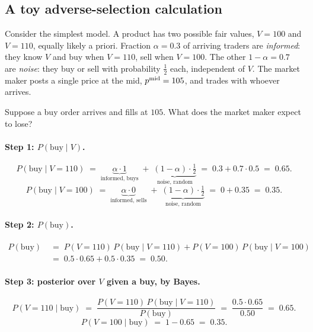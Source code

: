 \subsection{A toy adverse-selection calculation}
\label{subsec:toy_adverse}

Consider the simplest model. A product has two possible fair values,
$V = 100$ and $V = 110$, equally likely a priori. Fraction $\alpha =
0.3$ of arriving traders are \emph{informed}: they know $V$ and buy
when $V = 110$, sell when $V = 100$. The other $1 - \alpha = 0.7$ are
\emph{noise}: they buy or sell with probability $\tfrac{1}{2}$ each,
independent of $V$. The market maker posts a single price at the mid,
$p^{\mathrm{mid}} = 105$, and trades with whoever arrives.

Suppose a buy order arrives and fills at $105$. What does the market
maker expect to lose?

\paragraph{Step 1: $P(\text{buy} \mid V)$.}
\[
  P(\text{buy} \mid V = 110) \;=\; \underbrace{\alpha \cdot 1}_{\text{informed, buys}}
    \;+\; \underbrace{(1 - \alpha) \cdot \tfrac{1}{2}}_{\text{noise, random}}
    \;=\; 0.3 + 0.7 \cdot 0.5 \;=\; 0.65.
\]
\[
  P(\text{buy} \mid V = 100) \;=\; \underbrace{\alpha \cdot 0}_{\text{informed, sells}}
    \;+\; \underbrace{(1 - \alpha) \cdot \tfrac{1}{2}}_{\text{noise, random}}
    \;=\; 0 + 0.35 \;=\; 0.35.
\]

\paragraph{Step 2: $P(\text{buy})$.}
\begin{align*}
  P(\text{buy}) &\;=\; P(V = 110)\,P(\text{buy} \mid V = 110)
                     + P(V = 100)\,P(\text{buy} \mid V = 100) \\
                &\;=\; 0.5 \cdot 0.65 + 0.5 \cdot 0.35
                 \;=\; 0.50.
\end{align*}

\paragraph{Step 3: posterior over $V$ given a buy, by Bayes.}
\[
  P(V = 110 \mid \text{buy})
    \;=\; \frac{P(V = 110)\,P(\text{buy} \mid V = 110)}{P(\text{buy})}
    \;=\; \frac{0.5 \cdot 0.65}{0.50}
    \;=\; 0.65.
\]
\[
  P(V = 100 \mid \text{buy}) \;=\; 1 - 0.65 \;=\; 0.35.
\]

